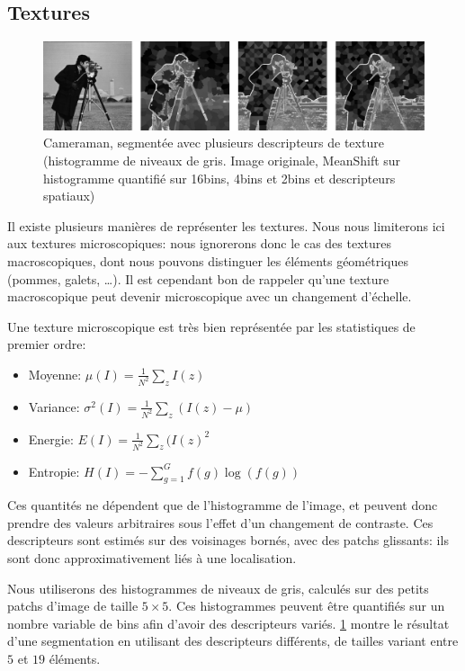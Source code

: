 \documentclass{article}
\begin{document}
\subsection{Textures}

\begin{figure}
\label{bins}
\includegraphics[width=500px]{images/cameraman.png}
\caption{Cameraman, segmentée avec plusieurs descripteurs de texture
(histogramme de niveaux de gris. Image originale, MeanShift sur histogramme
quantifié sur 16bins, 4bins et 2bins et descripteurs spatiaux)}
\end{figure}

Il existe plusieurs manières de représenter les textures. Nous nous limiterons
ici aux textures microscopiques: nous ignorerons donc le cas des textures
macroscopiques, dont nous pouvons distinguer les éléments géométriques
(pommes, galets, \dots). Il est cependant bon de rappeler qu'une texture
macroscopique peut devenir microscopique avec un changement d'échelle.

Une texture microscopique est très bien représentée par les statistiques de
premier ordre:
\begin{itemize}
\item Moyenne: $\mu(I) = \frac{1}{N^2} \sum_z I(z)$
\item Variance: $\sigma^2(I) = \frac{1}{N^2} \sum_z (I(z) - \mu)$
\item Energie: $E(I) = \frac{1}{N^2} \sum_z (I(z)^2$
\item Entropie: $H(I) = - \sum_{g = 1}^G f(g) \log(f(g))$
\end{itemize}

Ces quantités ne dépendent que de l'histogramme de l'image, et peuvent donc
prendre des valeurs arbitraires sous l'effet d'un changement de contraste.
Ces descripteurs  sont estimés sur des voisinages bornés, avec des patchs
glissants: ils sont donc approximativement liés à une localisation.

Nous utiliserons des histogrammes de niveaux de gris, calculés sur des petits
patchs d'image de taille $5 \times 5$. Ces histogrammes peuvent être
quantifiés sur un nombre variable de bins afin d'avoir des descripteurs
variés. \ref{bins} montre le résultat d'une segmentation en utilisant des
descripteurs différents, de tailles variant entre $5$ et $19$ éléments.
\end{document}
